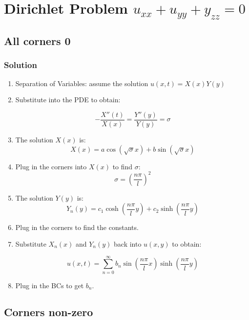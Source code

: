 \documentclass[11pt]{article}
\begin{document}
\section{Dirichlet Problem $u_{xx}+u_{yy}+y_{zz}=0$}
 
\subsection{All corners 0}
\subsubsection*{Solution}
\begin{enumerate}

\item Separation of Variables: assume the solution $u(x,t) = X(x)Y(y)$
\item Substitute into the PDE to obtain:

$$ -\frac{X''(t)}{X(x)} = \frac{Y''(y)}{Y(y)} = \sigma $$

\item The solution $X(x)$ is:
$$ X(x) = a\cos(\sqrt{\sigma}x) + b\sin(\sqrt{\sigma}x) $$

\item Plug in the corners into $X(x)$ to find $\sigma$:
$$ \sigma = (\frac{n\pi}{l})^2 $$

\item The solution $Y(y)$ is:
$$ Y_n(y) = c_1\cosh(\frac{n\pi}{l}y) + c_2\sinh(\frac{n\pi}{l}y) $$

\item Plug in the corners to find the constants.

\item Substitute $X_n(x)$ and $Y_n(y)$ back into $u(x,y)$ to obtain:

$$ u(x,t) = \sum \limits_{n=0}^{\infty} b_n\sin(\frac{n\pi}{l}x) \sinh(\frac{n\pi}{l}y) $$

\item Plug in the BCs to get $b_n$.
\end{enumerate}

\subsection{Corners non-zero}
\end{document}
